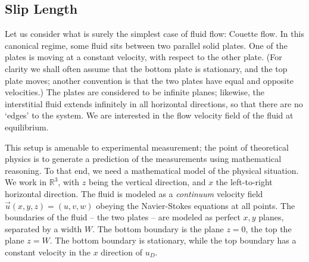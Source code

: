 \documentclass[a4paper]{report}
\begin{document}
\subsection*{Slip Length}

Let us consider what is surely the simplest case of fluid flow: Couette flow.  In this canonical regime, some fluid sits between two parallel solid plates. One of the plates is moving at a constant velocity, with respect to the other plate. (For clarity we shall often assume that the bottom plate is stationary, and the top plate moves; another convention is that the two plates have equal and opposite velocities.) The plates are considered to be infinite planes; likewise, the interstitial fluid extends infinitely in all horizontal directions, so that there are no `edges' to the system. We are interested in the flow velocity field of the fluid at equilibrium.

\vspace{1em}

\begin{center}
\end{center}

\vspace{1em}

This setup is amenable to experimental measurement; the point of theoretical physics is to generate a prediction of the measurements using mathematical reasoning.  To that end, we need a mathematical model of the physical situation.
We work in $\mathbb{R}^{3}$, with $z$ being the vertical direction, and $x$ the left-to-right horizontal direction. The fluid is modeled as a \emph{continuum} velocity field $\vec{u}(x,y,z) = (u,v,w) $ obeying the Navier-Stokes equations at all points. The boundaries of the fluid -- the two plates -- are modeled as perfect $x,y$ planes, separated by a width $W$. The bottom boundary is the plane $z=0$, the top the plane $z=W$.
The bottom boundary is stationary, while the top boundary has a constant velocity in the $x$ direction of $u_{D}$.
\end{document}
